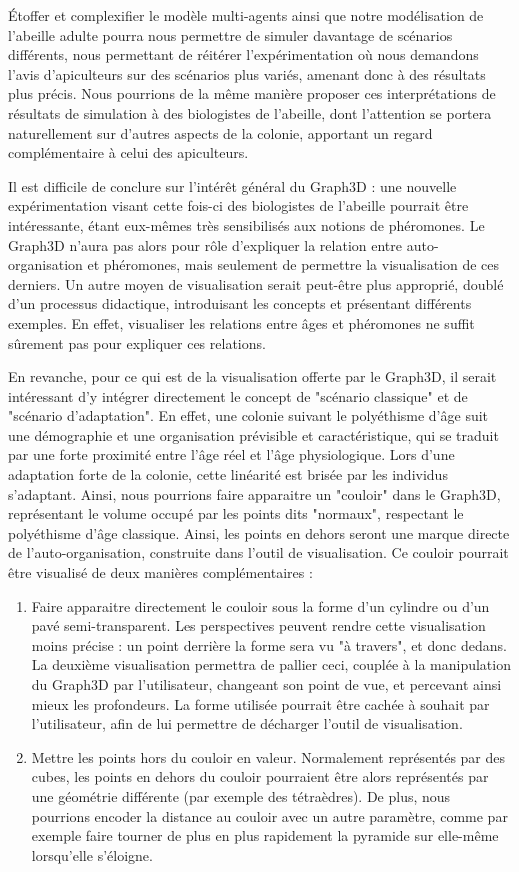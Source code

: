 	Étoffer et complexifier le modèle multi-agents ainsi que notre modélisation de l'abeille adulte pourra nous permettre de simuler davantage de scénarios différents, nous permettant de réitérer l'expérimentation où nous demandons l'avis d'apiculteurs sur des scénarios plus variés, amenant donc à des résultats plus précis. Nous pourrions de la même manière proposer ces interprétations de résultats de simulation à des biologistes de l'abeille, dont l'attention se portera naturellement sur d'autres aspects de la colonie, apportant un regard complémentaire à celui des apiculteurs.

Il est difficile de conclure sur l'intérêt général du Graph3D : une nouvelle expérimentation visant cette fois-ci des biologistes de l'abeille pourrait être intéressante, étant eux-mêmes très sensibilisés aux notions de phéromones. Le Graph3D n'aura pas alors pour rôle d'expliquer la relation entre auto-organisation et phéromones, mais seulement de permettre la visualisation de ces derniers. Un autre moyen de visualisation serait peut-être plus approprié, doublé d'un processus didactique, introduisant les concepts et présentant différents exemples. En effet, visualiser les relations entre âges et phéromones ne suffit sûrement pas pour expliquer ces relations.

	En revanche, pour ce qui est de la visualisation offerte par le Graph3D, il serait intéressant d'y intégrer directement le concept de "scénario classique" et de "scénario d'adaptation". En effet, une colonie suivant le polyéthisme d'âge suit une démographie et une organisation prévisible et caractéristique, qui se traduit par une forte proximité entre l'âge réel et l'âge physiologique. Lors d'une adaptation forte de la colonie, cette linéarité est brisée par les individus s'adaptant. Ainsi, nous pourrions faire apparaitre un "couloir" dans le Graph3D, représentant le volume occupé par les points dits "normaux", respectant le polyéthisme d'âge classique. Ainsi, les points en dehors seront une marque directe de l'auto-organisation, construite dans l'outil de visualisation. Ce couloir pourrait être visualisé de deux manières complémentaires :
	\begin{enumerate}
		\item Faire apparaitre directement le couloir sous la forme d'un cylindre ou d'un pavé semi-transparent. Les perspectives peuvent rendre cette visualisation moins précise : un point derrière la forme sera vu "à travers", et donc dedans. La deuxième visualisation permettra de pallier ceci, couplée à la manipulation du Graph3D par l'utilisateur, changeant son point de vue, et percevant ainsi mieux les profondeurs. La forme utilisée pourrait être cachée à souhait par l'utilisateur, afin de lui permettre de décharger l'outil de visualisation.
		\item Mettre les points hors du couloir en valeur. Normalement représentés par des cubes, les points en dehors du couloir pourraient être alors représentés par une géométrie différente (par exemple des tétraèdres). De plus, nous pourrions encoder la distance au couloir avec un autre paramètre, comme par exemple faire tourner de plus en plus rapidement la pyramide sur elle-même lorsqu'elle s'éloigne.
	\end{enumerate}
	
